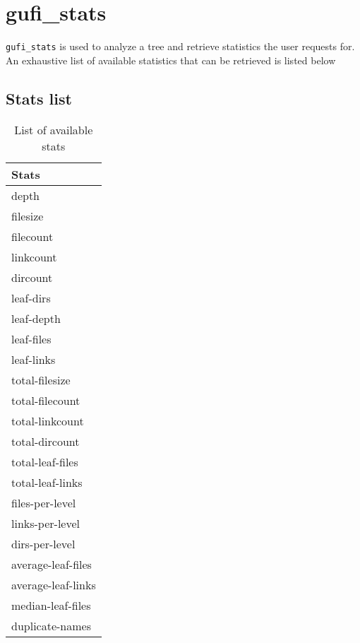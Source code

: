\section{gufi\_stats}
\texttt{gufi\_stats} is used to analyze a tree and retrieve statistics the user requests for. An exhaustive list of available statistics that can be retrieved is listed below

\subsection{Stats list}
\begin{table} [h]
\centering
\begin{tabular}{l}
Stats\\\hline
depth \\
filesize \\
filecount \\
linkcount \\
dircount \\
leaf-dirs \\
leaf-depth \\
leaf-files \\
leaf-links \\
total-filesize \\
total-filecount \\
total-linkcount \\
total-dircount \\
total-leaf-files \\
total-leaf-links \\
files-per-level \\
links-per-level \\
dirs-per-level \\
average-leaf-files \\
average-leaf-links \\
median-leaf-files \\
duplicate-names
\end{tabular}
\caption{\label{fig:stat_options}List of available stats}
\end{table}

